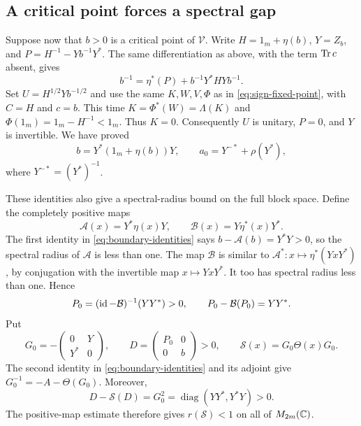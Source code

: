 \subsection{A critical point forces a spectral gap}
Suppose now that $b>0$ is a critical point of $\mathcal V$.
Write $H=1_m+\eta(b)$, $Y=Z_b$, and $P=H^{-1}-Yb^{-1}Y^*$.
The same differentiation as above, with the term $\operatorname{Tr} c$ absent, gives
\begin{equation}\label{eq:unregularized-critical}
 b^{-1}=\eta^*(P)+b^{-1}Y^*HYb^{-1}.
\end{equation}
Set $U=H^{1/2}Yb^{-1/2}$ and use the same $K,W,V,\Phi$ as in \eqref{eq:sign-fixed-point}, with $C=H$ and $c=b$.
This time $K=\Phi^*(W)=\Lambda(K)$ and $\Phi(1_m)=1_m-H^{-1}<1_m$.
Thus $K=0$.
Consequently $U$ is unitary, $P=0$, and $Y$ is invertible.
We have proved
\begin{equation}\label{eq:boundary-identities}
 b=Y^*(1_m+\eta(b))Y,\qquad
 a_0=Y^{-*}+\rho(Y^*),
\end{equation}
where $Y^{-*}=(Y^*)^{-1}$.

These identities also give a spectral-radius bound on the full block space.
Define the completely positive maps
\[
 \mathcal A(x)=Y^*\eta(x)Y,\qquad
 \mathcal B(x)=Y\eta^*(x)Y^*.
\]
The first identity in \eqref{eq:boundary-identities} says $b-\mathcal A(b)=Y^*Y>0$, so the spectral radius of $\mathcal A$ is less than one.
The map $\mathcal B$ is similar to $\mathcal A^*:x\mapsto\eta^*(YxY^*)$, by conjugation with the invertible map $x\mapsto YxY^*$.
It too has spectral radius less than one.
Hence
\[
 P_0=(\operatorname{id}-\mathcal B)^{-1}(YY^*)>0,
 \qquad P_0-\mathcal B(P_0)=YY^*.
\]
Put
\begin{equation}\label{eq:gap-basepoint}
 G_0=-\begin{pmatrix}0&Y\\Y^*&0\end{pmatrix},\qquad
 D=\begin{pmatrix}P_0&0\\0&b\end{pmatrix}>0,
 \qquad \mathcal S(x)=G_0\Theta(x)G_0.
\end{equation}
The second identity in \eqref{eq:boundary-identities} and its adjoint give $G_0^{-1}=-A-\Theta(G_0)$.
Moreover,
\begin{equation}\label{eq:strict-full-stability}
 D-\mathcal S(D)=G_0^2
       =\operatorname{diag}(YY^*,Y^*Y)>0.
\end{equation}
The positive-map estimate therefore gives $r(\mathcal S)<1$ on all of $M_{2m}(\mathbb C)$.

